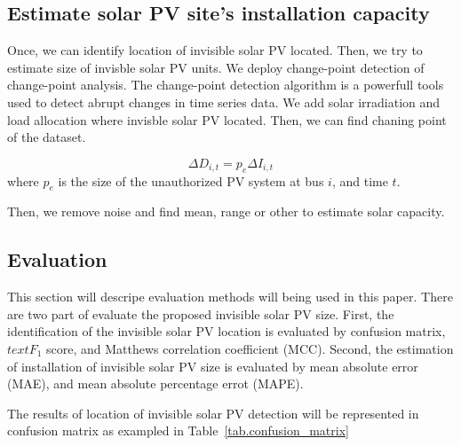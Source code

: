   \subsection{Estimate solar PV site's installation capacity}

  Once, we can identify location of invisible solar PV located. Then, we try to estimate size of invisble solar PV units.
  We deploy change-point detection of change-point analysis.
  The change-point detection algorithm is a powerfull tools used to detect abrupt changes in time series data.
  We add solar irradiation and load allocation where invisble solar PV located. Then, we can find chaning point of the dataset.

  \begin{equation}
    \Delta D_{i,t} = p_{e}\Delta I_{i,t}
  \end{equation}
  where $p_{e}$ is the size of the unauthorized PV system at bus $i$, and time $t$.

  Then, we remove noise and find mean, range or other to estimate solar capacity.

  \subsection{Evaluation}
  This section will descripe evaluation methods will being used in this paper.
  There are two part of evaluate the proposed invisible solar PV size.
  First, the identification of the invisible solar PV location is evaluated by confusion matrix, $text{F}_1$ score, and Matthews correlation coefficient (MCC).
  Second, the estimation of installation of invisible solar PV size is evaluated by mean absolute error (MAE), and mean absolute percentage errot (MAPE).

  The results of location of invisible solar PV detection will be represented in confusion matrix as exampled in Table~\ref{tab.confusion_matrix}

